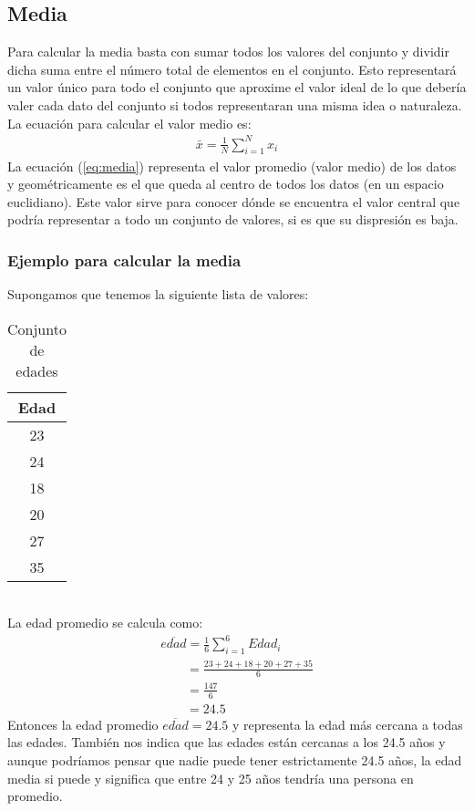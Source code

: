 \documentclass{article}
\begin{document}
\subsection{Media}

Para calcular la media basta con sumar todos los valores del conjunto y dividir dicha suma entre el número total de elementos en el conjunto. Esto representará un valor único para todo el conjunto que aproxime el valor ideal de lo que debería valer cada dato del conjunto si todos representaran una misma idea o naturaleza.
\\[12pt]
La ecuación para calcular el valor medio es:
\begin{equation}
    \begin{aligned}
        \bar{x} = \frac{1}{N} \sum_{i=1}^{N} x_i
    \end{aligned}
    \label{eq:media}
\end{equation}
La ecuación (\ref{eq:media}) representa el valor promedio (valor medio) de los datos y geométricamente es el que queda al centro de todos los datos (en un espacio euclidiano). Este valor sirve para conocer dónde se encuentra el valor central que podría representar a todo un conjunto de valores, si es que su dispresión es baja.

\subsubsection{Ejemplo para calcular la media}

Supongamos que tenemos la siguiente lista de valores:
\begin{table}[h!]
    \centering
    \begin{tabular}{|c|}
    \hline
    \textbf{Edad} \\ \hline
    23 \\ \hline
    24 \\ \hline
    18 \\ \hline
    20 \\ \hline
    27 \\ \hline
    35 \\ \hline
    \end{tabular}
    \caption{Conjunto de edades}
\end{table}
\\
La edad promedio se calcula como:
\begin{equation}
    \begin{aligned}
        \overline{edad} = \frac{1}{6} \sum_{i=1}^{6} Edad_i \\
        \qquad = \frac{23 + 24 + 18 + 20 + 27 + 35}{6} \\
        \qquad = \frac{147}{6} \\
        \qquad = 24.5
    \end{aligned}
\label{eq:media_edades}
\end{equation}
Entonces la edad promedio $\overline{edad} = 24.5$ y representa la edad más cercana a todas las edades. También nos indica que las edades están cercanas a los 24.5 años y aunque podríamos pensar que nadie puede tener estrictamente 24.5 años, la edad media si puede y significa que entre 24 y 25 años tendría una persona en promedio.
\end{document}
